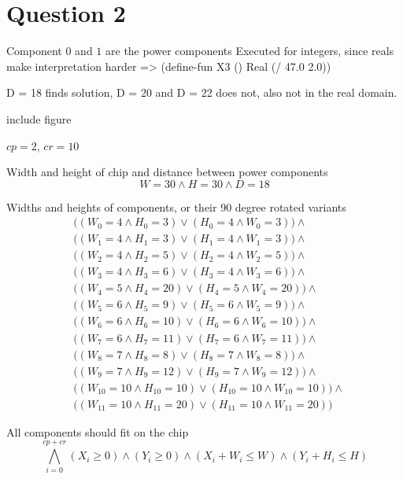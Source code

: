 \section{Question 2}








Component $0$ and $1$ are the power components
Executed for integers, since reals make interpretation harder =>
  (define-fun X3 () Real
    (/ 47.0 2.0))

D = 18 finds solution, D = 20 and D = 22 does not, also not in the real domain.

include figure

$cp = 2$, $cr = 10$


Width and height of chip and distance between power components
\begin{equation}
  \label{eqn:2_wh}
  W = 30 \wedge H = 30 \wedge D = 18
\end{equation}

Widths and heights of components, or their 90 degree rotated variants
\newcommand{\IIsize}[3]{
  &\Big(
    (W_{#1} = #2 \wedge H_{#1} = #3) \vee
    (H_{#1} = #2 \wedge W_{#1} = #3)
  \Big)
}
\begin{equation}
  \label{eqn:2_sizes}
  \begin{aligned}
    \IIsize{0} {4} {3}  \wedge \\
    \IIsize{1} {4} {3}  \wedge \\
    \IIsize{2} {4} {5}  \wedge \\
    \IIsize{3} {4} {6}  \wedge \\
    \IIsize{4} {5} {20} \wedge \\
    \IIsize{5} {6} {9}  \wedge \\
    \IIsize{6} {6} {10} \wedge \\
    \IIsize{7} {6} {11} \wedge \\
    \IIsize{8} {7} {8}  \wedge \\
    \IIsize{9} {7} {12} \wedge \\
    \IIsize{10}{10}{10} \wedge \\
    \IIsize{11}{10}{20}
  \end{aligned}
\end{equation}

All components should fit on the chip
\begin{equation}
  \label{eqn:2_allfit}
  \bigwedge_{i = 0}^{cp + cr}
    (X_{i} \geq 0) \wedge
    (Y_{i} \geq 0) \wedge
    (X_{i} + W_{i} \leq W) \wedge
    (Y_{i} + H_{i} \leq H)
\end{equation}

